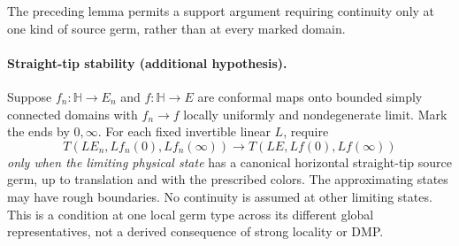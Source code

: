 \documentclass[11pt]{article}
\theoremstyle{definition}\newtheorem{definition}[theorem]{Definition}
\theoremstyle{remark}\newtheorem{remark}[theorem]{Remark}
\begin{document}
The preceding lemma permits a support argument requiring continuity only at
one kind of source germ, rather than at every marked domain.

\paragraph{Straight-tip stability (additional hypothesis).}
Suppose $f_n:\mathbb H\to E_n$ and $f:\mathbb H\to E$ are conformal maps onto
bounded simply connected domains with $f_n\to f$ locally uniformly and
nondegenerate limit. Mark the ends by $0,\infty$. For each fixed invertible
linear $L$, require
\[
 T(LE_n,Lf_n(0),Lf_n(\infty))\longrightarrow
 T(LE,Lf(0),Lf(\infty))
 \tag{AF4}
\]
\emph{only when the limiting physical state} has a canonical horizontal
straight-tip source germ, up to translation and with the prescribed colors.
The approximating states may have rough boundaries. No continuity is assumed
at other limiting states. This is a condition at one local germ type across
its different global representatives, not a derived consequence of strong
locality or DMP.
\end{document}
